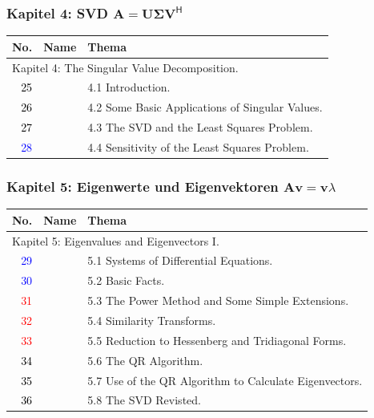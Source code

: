 \documentclass[10pt]{beamer} %
\newcommand{\bfA}{{\mathbf A}}
\newcommand{\bfU}{{\mathbf U}}
\newcommand{\bfV}{{\mathbf V}}
\newcommand{\bfv}{{\mathbf v}}
\newcommand{\bfSigma}{{\boldsymbol\Sigma}}
\begin{document}
\begin{frame}
  \frametitle{Kapitel 4: SVD $\bfA=\bfU\bfSigma\bfV^{\mathsf{H}}$}
  
  \begin{tabular}{|r|l|l|}\hline
  \textbf{No.} & \textbf{Name} & \textbf{Thema} \\\hline
  \multicolumn{3}{|l|}{Kapitel 4: The Singular Value Decomposition.}\\\hline
    \textcolor{black}{25}&&
  4.1 Introduction.\\\hline
    \textcolor{black}{26}&&
  4.2 Some Basic Applications of Singular Values.\\\hline
    \textcolor{black}{27}&&
  4.3 The SVD and the Least Squares Problem.\\\hline
    \textcolor{blue}{28}&&
  4.4 Sensitivity of the Least Squares Problem.\\\hline
  \end{tabular}

\end{frame}
\begin{frame}
  \frametitle{Kapitel 5: Eigenwerte und Eigenvektoren
    $\bfA\bfv=\bfv\lambda$}

  \begin{tabular}{|r|l|l|}\hline
  \textbf{No.} & \textbf{Name} & \textbf{Thema} \\\hline
  \multicolumn{3}{|l|}{Kapitel 5: Eigenvalues and Eigenvectors I.}\\\hline
    \textcolor{blue}{29}&&
  5.1 Systems of Differential Equations.\\\hline
    \textcolor{blue}{30}&&
  5.2 Basic Facts.\\\hline
    \textcolor{red}{31}&&
  5.3 The Power Method and Some Simple Extensions.\\\hline
    \textcolor{red}{32}&&
  5.4 Similarity Transforms.\\\hline
    \textcolor{red}{33}&&
  5.5 Reduction to Hessenberg and Tridiagonal Forms.\\\hline
    \textcolor{black}{34}&&
  5.6 The QR Algorithm.\\\hline
    \textcolor{black}{35}&&
  5.7 Use of the QR Algorithm to Calculate Eigenvectors.\\\hline
    \textcolor{black}{36}&&
  5.8 The SVD Revisted.\\\hline
  \end{tabular}

\end{frame}
\end{document}
